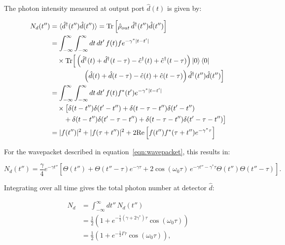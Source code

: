 The photon intensity measured at output port $\hat{d}(t)$ is given by:

\begin{equation}
\begin{aligned}
    N_d(t'') 
    &= \langle \hat{d}^{\dagger}(t'') \hat{d}(t'') \rangle 
    = \text{Tr}\left[\hat{\rho}_{out} \, \hat{d}^{\dagger}(t'') \hat{d}(t'')\right] \\
    &= \int_{-\infty}^{\infty} \int_{-\infty}^{\infty} dt \, dt' \, f(t) f e^{-\gamma^*|t - t'|} \\
    &\quad \times \text{Tr} \Big[ 
        \left( \hat{d}^{\dagger}(t) + \hat{d}^{\dagger}(t - \tau) 
              - \hat{e}^{\dagger}(t) + \hat{e}^{\dagger}(t - \tau) \right) 
        \ket{0} \bra{0} \\
    &\hspace{1.7cm}
         \left( \hat{d}(t) + \hat{d}(t - \tau) 
              - \hat{e}(t) + \hat{e}(t - \tau) \right)
        \hat{d}^{\dagger}(t'') \hat{d}(t'') 
    \Big] \\
    &= \int_{-\infty}^{\infty} \int_{-\infty}^{\infty} dt \, dt' \, f(t) f^*(t') e^{-\gamma^*|t - t'|} \\
    &\quad \times \big[ 
        \delta(t - t'') \delta(t' - t'') 
        + \delta(t - \tau - t'') \delta(t' - t'') \\
    &\qquad 
        + \delta(t - t'') \delta(t' - \tau - t'') 
        + \delta(t - \tau - t'') \delta(t' - \tau - t'') 
    \big] \\
    &= |f(t'')|^2 + |f(\tau+t'')|^2 + 2\text{Re}\left[f(t'')f^*(\tau+t'')e^{-\gamma^* \tau } \right]\\
\end{aligned}
\end{equation}

For the wavepacket described in equation~\ref{eqn:wavepacket}, this results in:

\begin{equation}
    N_d(t'') = \frac{\gamma}{4} e^{-\gamma t''} \left[\Theta(t'') + \Theta(t'' - \tau) e^{-\gamma \tau} + 2 \cos(\omega_0 \tau)\, e^{-\gamma t'' - \gamma^* \tau} \Theta(t'') \Theta(t'' - \tau) \right].
\end{equation}

Integrating over all time gives the total photon number at detector $\hat{d}$:

\begin{equation}
\begin{aligned}
    N_d &= \int_{-\infty}^{\infty} dt''\, N_d(t'') \\
        &= \frac{1}{2} \left(1 + e^{-\frac{1}{2}(\gamma + 2\gamma^*) \tau} \cos(\omega_0 \tau) \right) \\
        &= \frac{1}{2} \left(1 + e^{-\frac{1}{2} \Gamma \tau} \cos(\omega_0 \tau) \right),
\end{aligned}
\end{equation}


